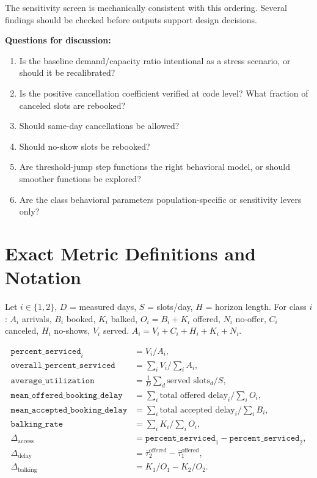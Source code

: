 \documentclass[11pt]{article}
\newcommand{\code}[1]{\texttt{#1}}
\begin{document}
The sensitivity screen is mechanically consistent with this ordering.
Several findings should be checked before outputs support design
decisions.

\bigskip
\textbf{Questions for discussion:}
\begin{enumerate}[leftmargin=2em, itemsep=4pt]
  \item Is the baseline demand/capacity ratio intentional as a stress
    scenario, or should it be recalibrated?
  \item Is the positive cancellation coefficient verified at code level?
    What fraction of canceled slots are rebooked?
  \item Should same-day cancellations be allowed?
  \item Should no-show slots be rebooked?
  \item Are threshold-jump step functions the right behavioral model,
    or should smoother functions be explored?
  \item Are the class behavioral parameters population-specific or
    sensitivity levers only?
\end{enumerate}

\appendix

\section{Exact Metric Definitions and Notation}
\label{app:metrics}

Let $i \in \{1,2\}$, $D$ = measured days, $S$ = slots/day, $H$ =
horizon length. For class $i$: $A_i$ arrivals, $B_i$ booked,
$K_i$ balked, $O_i = B_i + K_i$ offered, $N_i$ no-offer,
$C_i$ canceled, $H_i$ no-shows, $V_i$ served.
$A_i = V_i + C_i + H_i + K_i + N_i$.

\begin{align*}
  \code{percent\_serviced}_i &= V_i / A_i, \\
  \code{overall\_percent\_serviced} &= \textstyle\sum_i V_i / \sum_i A_i, \\
  \code{average\_utilization} &= \frac{1}{D}\sum_d \text{served slots}_d / S, \\
  \code{mean\_offered\_booking\_delay} &= \textstyle\sum_i \text{total offered delay}_i / \sum_i O_i, \\
  \code{mean\_accepted\_booking\_delay} &= \textstyle\sum_i \text{total accepted delay}_i / \sum_i B_i, \\
  \code{balking\_rate} &= \textstyle\sum_i K_i / \sum_i O_i, \\
  \Delta_{\text{access}} &= \code{percent\_serviced}_1 - \code{percent\_serviced}_2, \\
  \Delta_{\text{delay}} &= \bar{\tau}^{\text{offered}}_2 - \bar{\tau}^{\text{offered}}_1, \\
  \Delta_{\text{balking}} &= K_1/O_1 - K_2/O_2.
\end{align*}
\end{document}
